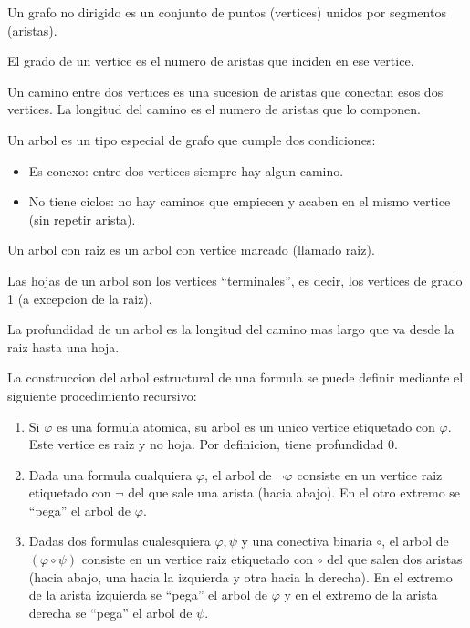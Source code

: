 \begin{definition}
	Un grafo no dirigido es un conjunto de puntos (vertices) unidos por segmentos (aristas).

	El grado de un vertice es el numero de aristas que inciden en ese vertice.

	Un camino entre dos vertices es una sucesion de aristas que conectan esos dos vertices. La longitud del camino es el numero de aristas que lo componen.
\end{definition}
\begin{definition}
	Un arbol es un tipo especial de grafo que cumple dos condiciones:
	\begin{itemize}
		\item Es conexo: entre dos vertices siempre hay algun camino.
		\item No tiene ciclos: no hay caminos que empiecen y acaben en el mismo vertice (sin repetir arista).
	\end{itemize}

	Un arbol con raiz es un arbol con vertice marcado (llamado raiz).

	Las hojas de un arbol son los vertices ``terminales'', es decir, los vertices de grado 1 (a excepcion de la raiz).

	La profundidad de un arbol es la longitud del camino mas largo que va desde la raiz hasta una hoja.
\end{definition}

\begin{definition}
	La construccion del arbol estructural de una formula se puede definir mediante el siguiente procedimiento recursivo:
	\begin{enumerate}
		\item Si \(\varphi\) es una formula atomica, su arbol es un unico vertice etiquetado con \(\varphi\). Este vertice es raiz y no hoja. Por definicion, tiene profundidad 0.
		\item Dada una formula cualquiera \(\varphi\), el arbol de \(\neg \varphi\) consiste en un vertice raiz etiquetado con \(\neg \) del que sale una arista (hacia abajo). En el otro extremo se ``pega'' el arbol de \(\varphi\).
		\item Dadas dos formulas cualesquiera \(\varphi, \psi \) y una conectiva binaria \(\circ \), el arbol de \((\varphi \circ \psi )\) consiste en un vertice raiz etiquetado con \(\circ \) del que salen dos aristas (hacia abajo, una hacia la izquierda y otra hacia la derecha). En el extremo de la arista izquierda se ``pega'' el arbol de \(\varphi\) y en el extremo de la arista derecha se ``pega'' el arbol de \(\psi\).
	\end{enumerate}
\end{definition}

